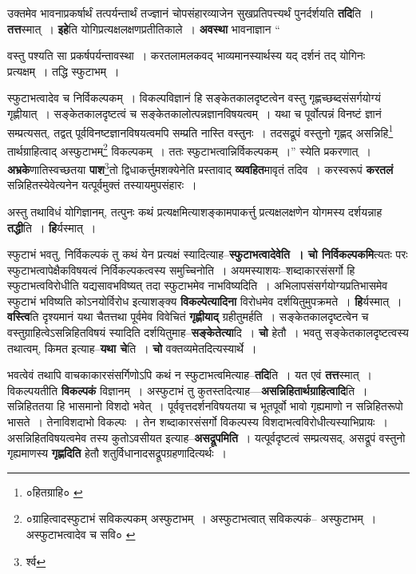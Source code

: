 \documentclass[article,12pt,a4paper]{memoir}
\begin{document}
	  \pstart उक्तमेव भावनाप्रकर्षार्थं तत्पर्यन्तार्थं तज्ज्ञानं चोपसंहारव्याजेन सुखप्रतिपत्त्यर्थं पुनर्दर्शयति \textbf{तदि}ति । \textbf{तत्त}स्मात् । \textbf{इहे}ति योगिप्रत्यक्षलक्षणप्रतीतिकाले । \textbf{अवस्था} भावनाज्ञान  \leavevmode{} “
	  
	वस्तु पश्यति सा प्रकर्षपर्यन्तावस्था । करतलामलकवद् भाव्यमानस्यार्थस्य यद् दर्शनं तद् योगिनः प्रत्यक्षम् । तद्धि स्फुटाभम् । 
	  
	स्फुटाभत्वादेव च निर्विकल्पकम् । विकल्पविज्ञानं हि सङ्केतकालदृष्टत्वेन वस्तु गृह्णच्छब्दसंसर्गयोग्यं गृह्णीयात् । सङ्केतकालदृष्टत्वं च सङ्केतकालोत्पन्नज्ञानविषयत्वम् । यथा च पूर्वोत्पन्नं विनष्टं ज्ञानं सम्प्रत्यसत्, तद्वत् पूर्वविनष्टज्ञानविषयत्वमपि सम्प्रति नास्ति वस्तुनः । तदसद्रूपं वस्तुनो गृह्णद् असन्निहि\footnote{०हितग्राहि० \cite{dp-msB} \cite{dp-msC}} तार्थग्राहित्वाद् अस्फुटाभम्\footnote{०ग्राहित्वादस्फुटाभं सविकल्पकम् \cite{dp-msC} अस्फुटाभम् । अस्फुटाभत्वात् सविकल्पकं--\cite{dp-msA} \cite{dp-edP} अस्फुटाभम् । अस्फुटाभत्वादेव च सवि० \cite{dp-msD} \cite{dp-msB} \cite{dp-edH} \cite{dp-edE} \cite{dp-edN}} विकल्पकम् । ततः स्फुटाभत्वान्निर्विकल्पकम् ।” स्येति प्रकरणात् । \textbf{अभ्रके}णातिस्वच्छतया \textbf{पाश}\footnote{र्श्व}\-तो द्विधाकर्त्तुमशक्येनेति प्रस्तावाद् \textbf{व्यवहित}मावृतं तदिव । करस्वरूपं \textbf{करतलं} सन्निहितस्येवेत्यनेन यत्पूर्वमुक्तं\leavevmode{} तस्यायमुपसंहारः ।
	\pend
      

	  \pstart अस्तु तथाविधं योगिज्ञानम्, तत्पुनः कथं प्रत्यक्षमित्याशङ्कामपाकर्त्तु प्रत्यक्षलक्षणेन योगमस्य दर्शयन्नाह \textbf{तद्धी}ति । \textbf{हि}र्यस्मात् ।
	\pend
      

	  \pstart स्फुटाभं भवतु, निर्विकल्पकं तु कथं येन प्रत्यक्षं स्यादित्याह--\textbf{स्फुटाभत्वादेवेति । चो निर्विकल्पकमि}त्यतः परः स्फुटाभत्वापेक्षैकविषयत्वं निर्विकल्पकत्वस्य समुच्चिनोति । अयमस्याशयः--शब्दाकारसंसर्गो हि स्फुटाभत्वविरोधीति यद्यसावभविष्यत् तदा स्फुटाभमेव नाभविष्यदिति । अभिलापसंसर्गयोग्यप्रतिभासमेव स्फुटाभं भविष्यति कोऽनयोर्विरोध इत्याशङ्क्य \textbf{विकल्पेत्यादिना} विरोधमेव दर्शयितुमुपक्रमते । \textbf{हि}र्यस्मात् । \textbf{वस्त्वि}ति दृश्यमानं यथा चैतत्तथा पूर्वमेव विवेचितं \textbf{गृह्णीयाद्} ग्रहीतुमर्हति । सङ्केतकालदृष्टत्वेन च वस्तुग्राहित्वेऽसन्निहितविषयं स्यादिति दर्शयितुमाह--\textbf{सङ्केतेत्या}दि । \textbf{चो} हेतौ । भवतु सङ्केतकालदृष्टत्वस्य तथात्वम्, किमत इत्याह--\textbf{यथा चे}ति । \textbf{चो} वक्तव्यमेतदित्यस्यार्थे ।
	\pend
      

	  \pstart भवत्वेवं तथापि वाचकाकारसंसर्गिणोऽपि कथं न स्फुटाभत्वमित्याह--\textbf{तदि}ति । यत एवं \textbf{तत्त}स्मात् । विकल्पयतीति \textbf{विकल्पकं} विज्ञानम् । अस्फुटाभं तु कुतस्तदित्याह—\textbf{असन्निहितार्थग्राहित्वादि}ति । सन्निहिततया हि भासमानो विशदो भवेत् । पूर्ववृत्तदर्शनविषयतया च भूतपूर्वो भावो गृह्यमाणो न सन्निहितरूपो भासते । तेनाविशदाभो विकल्पः । तेन शब्दाकारसंसर्गो विकल्पस्य विशदाभत्वविरोधीत्यस्याभिप्रायः । असन्निहितविषयत्वमेव तस्य कुतोऽवसीयत इत्याह--\textbf{असद्रूपमिति} । यत्पूर्वदृष्टत्वं सम्प्रत्यसद्, असद्रूपं वस्तुनो गृह्यमाणस्य \textbf{गृह्णदिति} हेतौ शतुर्विधानादसद्रूपग्रहणादित्यर्थः ।
	\pend
      
\end{document}
